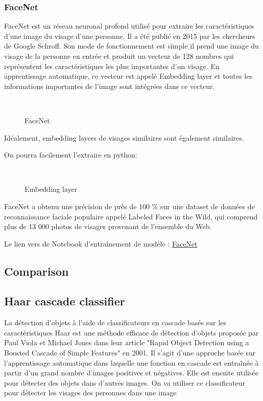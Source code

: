 {\subsubsection{FaceNet}
FaceNet est un réseau neuronal profond utilisé pour extraire les caractéristiques d'une image du visage d'une personne. Il a été publié en 2015 par les chercheurs de Google Schroff. Son mode de fonctionnement est simple il prend une image du visage de la personne en entrée et produit un vecteur de 128 nombres qui représentent les caractéristiques les plus importantes d'un visage. En apprentissage automatique, ce vecteur est appelé Embedding layer et toutes les informations importantes de l'image sont intégrées dans ce vecteur. 
\begin{figure}[H] 
\centering
{}\\[0.5cm]
\caption{FaceNet}
\label{fig:figure14}
\end{figure}

Idéalement, embedding layers de visages similaires sont également similaires.

On pourra facilement l'extraire en python:
\begin{figure}[H] 
\centering
{}\\[0.5cm]
\caption{Embedding layer}
\label{fig:figure14}
\end{figure}

FaceNet a obtenu une précision de près de 100 \% sur une dataset de données de reconnaissance faciale populaire appelé Labeled Faces in the Wild, qui comprend plus de 13 000 photos de visages provenant de l'ensemble du Web.



Le lien vers de Notebook d'entraînement de modèle : 
\href{https://github.com/mohammedAljadd/iEars/blob/main/Model%20training/Face%20identification/4-FaceNet.ipynb}{FaceNet}


\subsection{Comparison}
\subsection{Haar cascade classifier}
La détection d'objets à l'aide de classificateurs en cascade basés sur les caractéristiques Haar est une méthode efficace de détection d'objets proposée par Paul Viola et Michael Jones dans leur article "Rapid Object Detection using a Boosted Cascade of Simple Features" en 2001. Il s'agit d'une approche basée sur l'apprentissage automatique dans laquelle une fonction en cascade est entraînée à partir d'un grand nombre d'images positives et négatives. Elle est ensuite utilisée pour détecter des objets dans d'autres images.
On va utiliser ce classificateur pour détecter les visages des personnes dans une image
\label{sec:haar}

}
